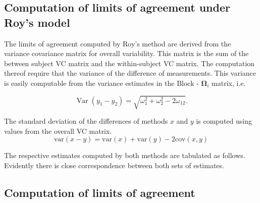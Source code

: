 \documentclass[12pt, a4paper]{report}
\theoremstyle{plain}
\theoremstyle{definition}
\theoremstyle{remark}
\begin{document}
	


\subsection{Computation of limits of agreement under Roy's model}
	The limits of agreement computed by Roy's method are derived from the variance covariance matrix for overall variability.
	This matrix is the sum of the between subject VC matrix and the within-subject VC matrix.
	The computation thereof require that the variance of the difference of measurements. This variance is easily computable from the  variance estimates in the ${\mbox{Block - }\boldsymbol \Omega_{i}}$ matrix, i.e.
	
	
	\[
	\operatorname{Var}(y_1 - y_2) = \sqrt{ \omega^2_1 + \omega^2_2 - 2\omega_{12}}.
	\]
	
	
	
	
	

	
	
	
	The standard deviation of the differences of methods $x$ and $y$ is computed using values from the overall VC matrix.
	\[
	\mbox{var}(x - y ) = \mbox{var} ( x )  + \mbox{var} ( y ) - 2\mbox{cov} ( x ,y )
	\]
	
	
	The respective estimates computed by both methods are tabulated as follows. Evidently there is close correspondence between both sets of estimates.
	






\subsection{Computation of limits of agreement }
\end{document}
